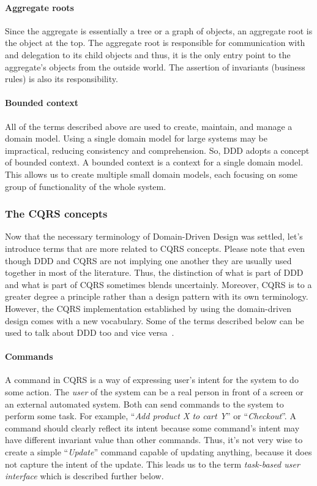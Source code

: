 \documentclass{book}
\begin{document}
\paragraph{Aggregate roots}\label{aggregate-roots}

Since the aggregate is essentially a tree or a graph of objects, an
aggregate root is the object at the top. The aggregate root is
responsible for communication with and delegation to its child objects
and thus, it is the only entry point to the aggregate's objects from the
outside world. The assertion of invariants (business rules) is also its
responsibility.

\paragraph{Bounded context}\label{bounded-context}

All of the terms described above are used to create, maintain, and
manage a domain model. Using a single domain model for large systems may
be impractical, reducing consistency and comprehension. So, DDD adopts a
concept of bounded context. A bounded context is a context for a single
domain model. This allows us to create multiple small domain models,
each focusing on some group of functionality of the whole system.

\subsubsection{The CQRS concepts}\label{the-cqrs-concepts}

Now that the necessary terminology of Domain-Driven Design was settled,
let's introduce terms that are more related to CQRS concepts. Please
note that even though DDD and CQRS are not implying one another they are
usually used together in most of the literature. Thus, the distinction
of what is part of DDD and what is part of CQRS sometimes blends
uncertainly. Moreover, CQRS is to a greater degree a principle rather
than a design pattern with its own terminology. However, the CQRS
implementation established by using the domain-driven design comes with
a new vocabulary. Some of the terms described below can be used to talk
about DDD too and vice versa~\cite{ddd-terms}.

\paragraph{Commands}\label{commands}

A command in CQRS is a way of expressing user's intent for the system to
do some action. The \emph{user} of the system can be a real person in
front of a screen or an external automated system. Both can send
commands to the system to perform some task. For example, ``\emph{Add
product X to cart Y}'' or ``\emph{Checkout}''. A command should clearly
reflect its intent because some command's intent may have different
invariant value than other commands. Thus, it's not very wise to create
a simple ``\emph{Update}'' command capable of updating anything, because
it does not capture the intent of the update. This leads us to the term
\emph{task-based user interface} which is described further below.
\end{document}
